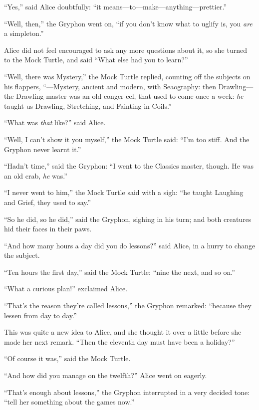 \documentclass[11pt,openany,oneside]{book}
\begin{document}
“Yes,” said Alice doubtfully: “it means—to—make—anything—prettier.” 

“Well, then,” the Gryphon went on, “if you don’t know what to uglify is, you {\em are\/} a simpleton.” 

Alice did not feel encouraged to ask any more questions about it, so she turned to the Mock Turtle, and said “What else had you to learn?” 

“Well, there was Mystery,” the Mock Turtle replied, counting off the subjects on his flappers, “—Mystery, ancient and modern, with Seaography: then Drawling—the Drawling-master was an old conger-eel, that used to come once a week: {\em he\/} taught us Drawling, Stretching, and Fainting in Coils.” 

“What was {\em that\/} like?” said Alice. 

“Well, I can’t show it you myself,” the Mock Turtle said: “I’m too stiff. And the Gryphon never learnt it.” 

“Hadn’t time,” said the Gryphon: “I went to the Classics master, though. He was an old crab, {\em he\/} was.” 

“I never went to him,” the Mock Turtle said with a sigh: “he taught Laughing and Grief, they used to say.” 

“So he did, so he did,” said the Gryphon, sighing in his turn; and both creatures hid their faces in their paws. 

“And how many hours a day did you do lessons?” said Alice, in a hurry to change the subject. 

“Ten hours the first day,” said the Mock Turtle: “nine the next, and so on.” 

“What a curious plan!” exclaimed Alice. 

“That’s the reason they’re called lessons,” the Gryphon remarked: “because they lessen from day to day.” 

This was quite a new idea to Alice, and she thought it over a little before she made her next remark. “Then the eleventh day must have been a holiday?” 

“Of course it was,” said the Mock Turtle. 

“And how did you manage on the twelfth?” Alice went on eagerly. 

“That’s enough about lessons,” the Gryphon interrupted in a very decided tone: “tell her something about the games now.” 


\clearpage{}
{}
\end{document}
